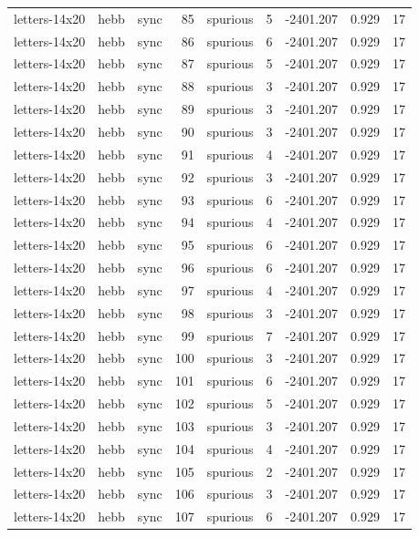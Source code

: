 \begin{tabular}{lllrlrrrr}
letters-14x20 & hebb & sync & 85 & spurious & 5 & -2401.207 & 0.929 & 17 \\
letters-14x20 & hebb & sync & 86 & spurious & 6 & -2401.207 & 0.929 & 17 \\
letters-14x20 & hebb & sync & 87 & spurious & 5 & -2401.207 & 0.929 & 17 \\
letters-14x20 & hebb & sync & 88 & spurious & 3 & -2401.207 & 0.929 & 17 \\
letters-14x20 & hebb & sync & 89 & spurious & 3 & -2401.207 & 0.929 & 17 \\
letters-14x20 & hebb & sync & 90 & spurious & 3 & -2401.207 & 0.929 & 17 \\
letters-14x20 & hebb & sync & 91 & spurious & 4 & -2401.207 & 0.929 & 17 \\
letters-14x20 & hebb & sync & 92 & spurious & 3 & -2401.207 & 0.929 & 17 \\
letters-14x20 & hebb & sync & 93 & spurious & 6 & -2401.207 & 0.929 & 17 \\
letters-14x20 & hebb & sync & 94 & spurious & 4 & -2401.207 & 0.929 & 17 \\
letters-14x20 & hebb & sync & 95 & spurious & 6 & -2401.207 & 0.929 & 17 \\
letters-14x20 & hebb & sync & 96 & spurious & 6 & -2401.207 & 0.929 & 17 \\
letters-14x20 & hebb & sync & 97 & spurious & 4 & -2401.207 & 0.929 & 17 \\
letters-14x20 & hebb & sync & 98 & spurious & 3 & -2401.207 & 0.929 & 17 \\
letters-14x20 & hebb & sync & 99 & spurious & 7 & -2401.207 & 0.929 & 17 \\
letters-14x20 & hebb & sync & 100 & spurious & 3 & -2401.207 & 0.929 & 17 \\
letters-14x20 & hebb & sync & 101 & spurious & 6 & -2401.207 & 0.929 & 17 \\
letters-14x20 & hebb & sync & 102 & spurious & 5 & -2401.207 & 0.929 & 17 \\
letters-14x20 & hebb & sync & 103 & spurious & 3 & -2401.207 & 0.929 & 17 \\
letters-14x20 & hebb & sync & 104 & spurious & 4 & -2401.207 & 0.929 & 17 \\
letters-14x20 & hebb & sync & 105 & spurious & 2 & -2401.207 & 0.929 & 17 \\
letters-14x20 & hebb & sync & 106 & spurious & 3 & -2401.207 & 0.929 & 17 \\
letters-14x20 & hebb & sync & 107 & spurious & 6 & -2401.207 & 0.929 & 17 \\

\end{tabular}
